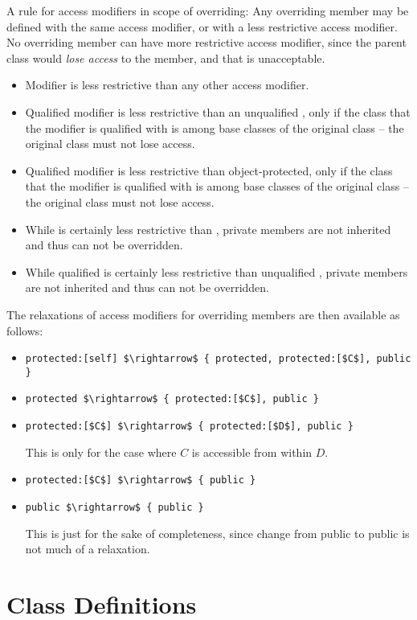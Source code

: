 A rule for access modifiers in scope of overriding: Any overriding member may be defined with the same access modifier, or with a less restrictive access modifier. No overriding member can have more restrictive access modifier, since the parent class would {\em lose access} to the member, and that is unacceptable. 
\begin{itemize}
\item Modifier  is less restrictive than any other access modifier. 
\item Qualified modifier  is less restrictive than an unqualified , only if the class that the modifier is qualified with is among base classes of the original class -- the original class must not lose access. 
\item Qualified modifier  is less restrictive than object-protected, only if the class that the modifier is qualified with is among base classes of the original class -- the original class must not lose access. 
\item While  is certainly less restrictive than , private members are not inherited and thus can not be overridden. 
\item While qualified  is certainly less restrictive than unqualified , private members are not inherited and thus can not be overridden. 
\end{itemize}
The relaxations of access modifiers for overriding members are then available as follows: 
\begin{itemize}
\item \lstinline!protected:[self] $\rightarrow$ { protected, protected:[$C$], public }!
\item \lstinline!protected $\rightarrow$ { protected:[$C$], public }!
\item \lstinline!protected:[$C$] $\rightarrow$ { protected:[$D$], public }!

This is only for the case where $C$ is accessible from within $D$. 
\item \lstinline!protected:[$C$] $\rightarrow$ { public }!
\item \lstinline!public $\rightarrow$ { public }!

This is just for the sake of completeness, since change from public to public is not much of a relaxation. 
\end{itemize}

\section{Class Definitions}
\label{sec:class-definitions}

